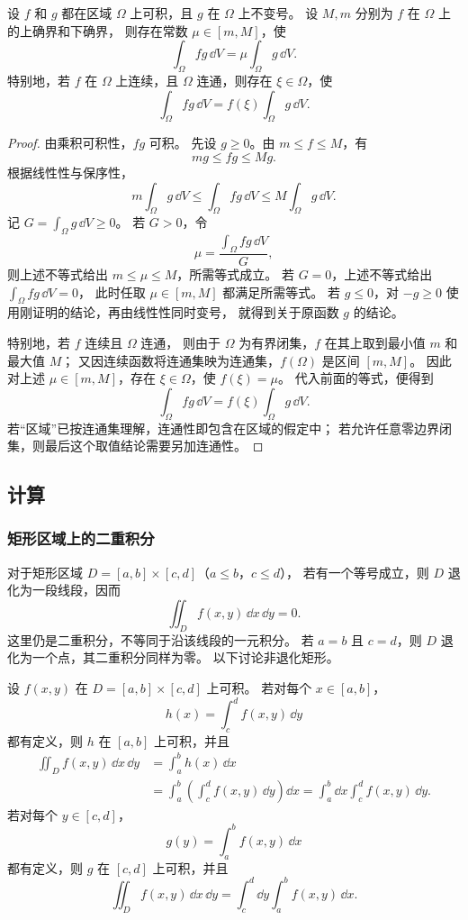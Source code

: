 \begin{proposition}[积分中值定理]\label{p2-integral-mean-value}
设 $f$ 和 $g$ 都在区域 $\Omega$ 上可积，且 $g$ 在 $\Omega$ 上不变号。
设 $M,m$ 分别为 $f$ 在 $\Omega$ 上的上确界和下确界，
则存在常数 $\mu\in[m,M]$，使
\[
\int_\Omega f g\,\dd V=\mu\int_\Omega g\,\dd V.
\]
特别地，若 $f$ 在 $\Omega$ 上连续，且 $\Omega$ 连通，则存在 $\xi\in\Omega$，使
\[
\int_\Omega f g\,\dd V=f(\xi)\int_\Omega g\,\dd V.
\]
\end{proposition}
\begin{proof}
由乘积可积性，$fg$ 可积。
先设 $g\ge0$。由 $m\le f\le M$，有
\[
mg\le fg\le Mg.
\]
根据线性性与保序性，
\[
m\int_\Omega g\,\dd V
\le\int_\Omega fg\,\dd V
\le M\int_\Omega g\,\dd V.
\]
记 $\displaystyle G=\displaystyle\int_\Omega g\,\dd V\ge0$。
若 $G>0$，令
\[
\mu=\frac{\displaystyle\int_\Omega fg\,\dd V}{G},
\]
则上述不等式给出 $m\le\mu\le M$，所需等式成立。
若 $G=0$，上述不等式给出 $\displaystyle\int_\Omega fg\,\dd V=0$，
此时任取 $\mu\in[m,M]$ 都满足所需等式。
若 $g\le0$，对 $-g\ge0$ 使用刚证明的结论，再由线性性同时变号，
就得到关于原函数 $g$ 的结论。

特别地，若 $f$ 连续且 $\Omega$ 连通，
则由于 $\Omega$ 为有界闭集，$f$ 在其上取到最小值 $m$ 和最大值 $M$；
又因连续函数将连通集映为连通集，$f(\Omega)$ 是区间 $[m,M]$。
因此对上述 $\mu\in[m,M]$，存在 $\xi\in\Omega$，使 $f(\xi)=\mu$。
代入前面的等式，便得到
\[
\int_\Omega fg\,\dd V=f(\xi)\int_\Omega g\,\dd V.
\]
若“区域”已按连通集理解，连通性即包含在区域的假定中；
若允许任意零边界闭集，则最后这个取值结论需要另加连通性。
\end{proof}

\subsection*{计算}
\subsubsection*{矩形区域上的二重积分}

对于矩形区域 $D=[a,b]\times[c,d]$（$a\le b$，$c\le d$），
若有一个等号成立，则 $D$ 退化为一段线段，因而
\[
\iint_D f(x,y)\,\dd x\,\dd y=0.
\]
这里仍是二重积分，不等同于沿该线段的一元积分。
若 $a=b$ 且 $c=d$，则 $D$ 退化为一个点，其二重积分同样为零。
以下讨论非退化矩形。

\begin{theorem}[矩形区域上二重积分与累次积分的关系]\label{p2-double-iterated-integral}
设 $f(x,y)$ 在 $D=[a,b]\times[c,d]$ 上可积。
若对每个 $x\in[a,b]$，
\[
h(x)=\int_c^d f(x,y)\,\dd y
\]
都有定义，则 $h$ 在 $[a,b]$ 上可积，并且
\[
\begin{aligned}
\iint_D f(x,y)\,\dd x\,\dd y
&=\int_a^b h(x)\,\dd x\\
&=\int_a^b\left(\int_c^d f(x,y)\,\dd y\right)\dd x
=\int_a^b\dd x\int_c^d f(x,y)\,\dd y.
\end{aligned}
\]
若对每个 $y\in[c,d]$，
\[
g(y)=\int_a^b f(x,y)\,\dd x
\]
都有定义，则 $g$ 在 $[c,d]$ 上可积，并且
\[
\iint_D f(x,y)\,\dd x\,\dd y
=\int_c^d\dd y\int_a^b f(x,y)\,\dd x.
\]
\end{theorem}

